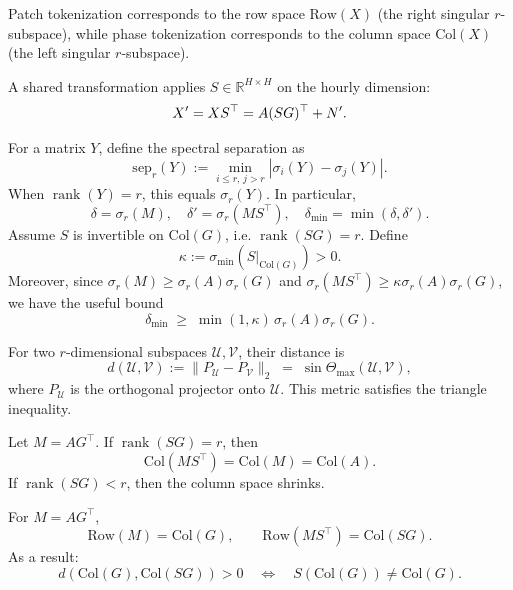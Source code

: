 Patch tokenization corresponds to the row space $\mathrm{Row}(X)$ (the right singular $r$-subspace), while phase tokenization corresponds to the column space $\mathrm{Col}(X)$ (the left singular $r$-subspace).

A shared transformation applies $S\in\mathbb{R}^{H\times H}$ on the hourly dimension:
\[
X^{\prime} = X S^\top = A (S G)^\top + N^{\prime}.
\]


For a matrix $Y$, define the spectral separation as
\[
\mathrm{sep}_r(Y) := \min_{i\le r,\,j>r}|\sigma_i(Y)-\sigma_j(Y)|.
\]
When $\operatorname{rank}(Y)=r$, this equals $\sigma_r(Y)$. In particular,
\[
\delta = \sigma_r(M), \quad \delta'=\sigma_r(MS^\top), \quad
\delta_{\min}=\min(\delta,\delta').
\]
Assume $S$ is invertible on $\mathrm{Col}(G)$, i.e. $\operatorname{rank}(S G)=r$. Define
\[
\kappa := \sigma_{\min}(S|_{\mathrm{Col}(G)})>0.
\]
Moreover, since $\sigma_r(M)\ge\sigma_r(A)\sigma_r(G)$ and 
$\sigma_r(MS^\top)\ge \kappa\sigma_r(A)\sigma_r(G)$, we have the useful bound
\[
\delta_{\min}\;\ge\;\min(1,\kappa)\,\sigma_r(A)\sigma_r(G).
\]

For two $r$-dimensional subspaces $\mathcal U,\mathcal V$, their distance is
\[
d(\mathcal U,\mathcal V) := \|P_{\mathcal U}-P_{\mathcal V}\|_2 \;=\; \sin\Theta_{\max}(\mathcal U,\mathcal V),
\]
where $P_{\mathcal U}$ is the orthogonal projector onto $\mathcal U$. 
This metric satisfies the triangle inequality.

\begin{lemma}
Let $M=A G^\top$. If $\operatorname{rank}(S G)=r$, then
\[
\mathrm{Col}(M S^\top) = \mathrm{Col}(M) = \mathrm{Col}(A).
\]
If $\operatorname{rank}(S G)<r$, then the column space shrinks.
\end{lemma}

\begin{lemma}
For $M=A G^\top$,
\[
\mathrm{Row}(M) = \mathrm{Col}(G), \qquad \mathrm{Row}(M S^\top) = \mathrm{Col}(S G).
\]
As a result:
\[
d(\mathrm{Col}(G),\mathrm{Col}(S G))>0 \quad \Longleftrightarrow \quad S(\mathrm{Col}(G)) \neq \mathrm{Col}(G).
\]
\end{lemma}

